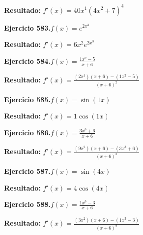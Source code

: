\documentclass[10pt,a4paper]{article}
\begin{document}
\begin{solbox}
\textbf{Resultado:} \(\displaystyle f'(x) = 40x^{1}(4x^{2} +7)^{4}\)
\end{solbox}

\newpage
\begin{ejbox}
\textbf{Ejercicio 583.}\quad $f(x) = e^{2x^{3}}$
\end{ejbox}

\begin{solbox}
\textbf{Resultado:} \(\displaystyle f'(x) = 6x^{2}e^{2x^{3}}\)
\end{solbox}

\begin{ejbox}
\textbf{Ejercicio 584.}\quad $f(x) = \frac{1x^{2} -5}{x + 6}$
\end{ejbox}

\begin{solbox}
\textbf{Resultado:} \(\displaystyle f'(x) = \frac{(2x^{1})(x+6) - (1x^{2} -5)}{(x+6)^2}\)
\end{solbox}

\begin{ejbox}
\textbf{Ejercicio 585.}\quad $f(x) = \sin(1x)$
\end{ejbox}

\begin{solbox}
\textbf{Resultado:} \(\displaystyle f'(x) = 1\cos(1x)\)
\end{solbox}

\newpage
\begin{ejbox}
\textbf{Ejercicio 586.}\quad $f(x) = \frac{3x^{3} +6}{x + 6}$
\end{ejbox}

\begin{solbox}
\textbf{Resultado:} \(\displaystyle f'(x) = \frac{(9x^{2})(x+6) - (3x^{3} +6)}{(x+6)^2}\)
\end{solbox}

\begin{ejbox}
\textbf{Ejercicio 587.}\quad $f(x) = \sin(4x)$
\end{ejbox}

\begin{solbox}
\textbf{Resultado:} \(\displaystyle f'(x) = 4\cos(4x)\)
\end{solbox}

\begin{ejbox}
\textbf{Ejercicio 588.}\quad $f(x) = \frac{1x^{3} -3}{x + 6}$
\end{ejbox}

\begin{solbox}
\textbf{Resultado:} \(\displaystyle f'(x) = \frac{(3x^{2})(x+6) - (1x^{3} -3)}{(x+6)^2}\)
\end{solbox}
\end{document}
